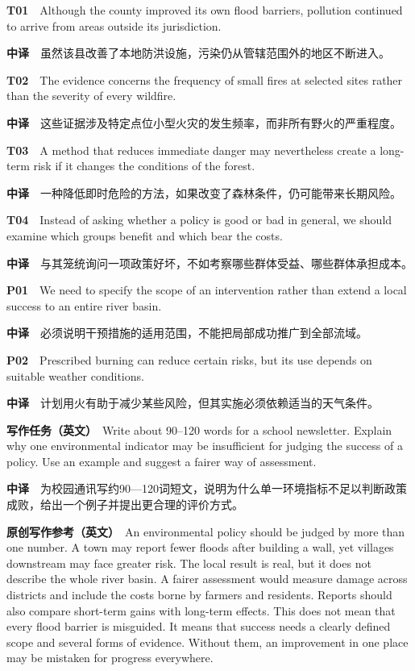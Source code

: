 \documentclass[
  11pt,
]{ctexart}
\begin{document}
\textbf{T01}　Although the county improved its own flood barriers,
pollution continued to arrive from areas outside its jurisdiction.

\textbf{中译}　虽然该县改善了本地防洪设施，污染仍从管辖范围外的地区不断进入。

\textbf{T02}　The evidence concerns the frequency of small fires at
selected sites rather than the severity of every wildfire.

\textbf{中译}　这些证据涉及特定点位小型火灾的发生频率，而非所有野火的严重程度。

\textbf{T03}　A method that reduces immediate danger may nevertheless
create a long-term risk if it changes the conditions of the forest.

\textbf{中译}　一种降低即时危险的方法，如果改变了森林条件，仍可能带来长期风险。

\textbf{T04}　Instead of asking whether a policy is good or bad in
general, we should examine which groups benefit and which bear the
costs.

\textbf{中译}　与其笼统询问一项政策好坏，不如考察哪些群体受益、哪些群体承担成本。

\textbf{P01}　We need to specify the scope of an intervention rather
than extend a local success to an entire river basin.

\textbf{中译}　必须说明干预措施的适用范围，不能把局部成功推广到全部流域。

\textbf{P02}　Prescribed burning can reduce certain risks, but its use
depends on suitable weather conditions.

\textbf{中译}　计划用火有助于减少某些风险，但其实施必须依赖适当的天气条件。

\textbf{写作任务（英文）}　Write about 90--120 words for a school
newsletter. Explain why one environmental indicator may be insufficient
for judging the success of a policy. Use an example and suggest a fairer
way of assessment.

\textbf{中译}　为校园通讯写约90---120词短文，说明为什么单一环境指标不足以判断政策成败，给出一个例子并提出更合理的评价方式。

\textbf{原创写作参考（英文）}　An environmental policy should be judged
by more than one number. A town may report fewer floods after building a
wall, yet villages downstream may face greater risk. The local result is
real, but it does not describe the whole river basin. A fairer
assessment would measure damage across districts and include the costs
borne by farmers and residents. Reports should also compare short-term
gains with long-term effects. This does not mean that every flood
barrier is misguided. It means that success needs a clearly defined
scope and several forms of evidence. Without them, an improvement in one
place may be mistaken for progress everywhere.
\end{document}

